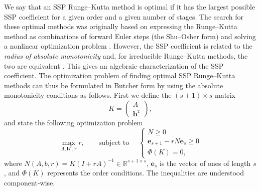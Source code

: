 We say that an SSP Runge--Kutta method is optimal if it has the largest possible SSP coefficient for a given order and a given number of stages.
The search for these optimal methods was originally based on expressing the Runge--Kutta method as combinations of forward Euler steps (the Shu--Osher form) and solving a nonlinear optimization problem \cite{Gottlieb1998, Gottlieb2001, Spiteri2003a, Spiteri2003b, Ruuth2004}.
However, the SSP coefficient is related to the \emph{radius of absolute monotonicity} \cite{Kraaijevanger1991} and, for irreducible Runge--Kutta methods, the two are equivalent \cite{Ferracina2004, Higueras2004}.
This gives an algebraic characterization of the SSP coefficient.
The optimization problem of finding optimal SSP Runge--Kutta methods can thus be formulated in Butcher form by using the absolute monotonicity conditions as follows.
First we define the \( (s+1) \times s \) matrix
\begin{equation}\label{eqKmat}
    K = \left(
            \begin{array}{c}
                     A              \\
                     \textbf{b}^{\texttt{T}}
            \end{array}
         \right),
\end{equation}
and state the following optimization problem
\begin{equation}\label{eqSSPopt}
    \max_{A, \bm{b}^{\texttt{T}}, r} r, \qquad \text{subject to } \quad \left\{
                                                 \begin{array}{ll}
                                                   N \geq 0 \\
                                                   \bm{e}_{s+1} - rN\bm{e}_{s} \geq 0 \\
                                                   \Phi(K) = 0,
                                                 \end{array}
                                               \right.
\end{equation}
where \( N(A,b,r) = K(I + rA)^{-1} \in \mathbb{R}^{s+1 \times s}\),
\( \bm{e}_s \) is the vector of ones of length $s$,
and \( \Phi(K) \) represents the  order conditions.
The inequalities are understood component-wise.

